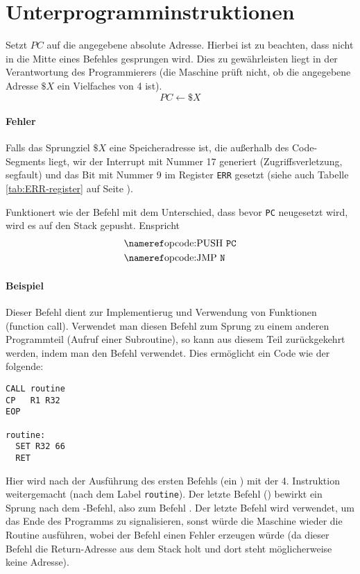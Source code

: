 \section{Unterprogramminstruktionen}

Setzt $PC$ auf die angegebene absolute Adresse. Hierbei ist zu beachten,  dass
nicht in die Mitte eines Befehles gesprungen wird. Dies zu gewährleisten liegt
in der Verantwortung des Programmierers (die Maschine prüft nicht, ob die
angegebene Adresse $\$X$ ein Vielfaches von 4 ist).
\[
    PC \gets \$X
\]

\paragraph{Fehler}
Falls das Sprungziel $\$X$ eine Speicheradresse ist, die außerhalb des
Code-Segments liegt, wir der Interrupt mit Nummer 17 generiert
(Zugriffsverletzung, segfault) und das Bit mit Nummer 9 im Register \texttt{ERR}
gesetzt (siehe auch Tabelle \ref{tab:ERR-register} auf Seite
\pageref{tab:ERR-register}).


Funktionert wie der Befehl  mit dem Unterschied, dass bevor
\texttt{PC} neugesetzt wird, wird es auf den Stack gepusht. Enspricht
\begin{align*}
 & \text{\opref{PUSH} \texttt{PC}} \\
 & \text{\opref{JMP}  \texttt{N}} 
\end{align*}

\paragraph{Beispiel}
Dieser Befehl dient zur Implementierug und Verwendung von Funktionen (function
call). Verwendet man diesen Befehl zum Sprung zu einem anderen Programmteil
(Aufruf einer Subroutine), so kann aus diesem Teil zurückgekehrt werden, indem
man den Befehl  verwendet. Dies ermöglicht ein Code wie der folgende:
\begin{lstlisting}
CALL routine
CP   R1 R32
EOP

routine:
  SET R32 66
  RET
\end{lstlisting}
Hier wird nach der Ausführung des ersten Befehls (ein ) mit der 4.
Instruktion weitergemacht (nach dem Label \texttt{routine}). Der letzte Befehl
() bewirkt ein Sprung nach dem -Befehl, also zum Befehl
. Der letzte Befehl  wird verwendet, um das Ende des
Programms zu signalisieren, sonst würde die Maschine wieder die Routine
ausführen, wobei der Befehl  einen Fehler erzeugen würde (da dieser
Befehl die Return-Adresse aus dem Stack holt und dort steht möglicherweise
keine Adresse).


